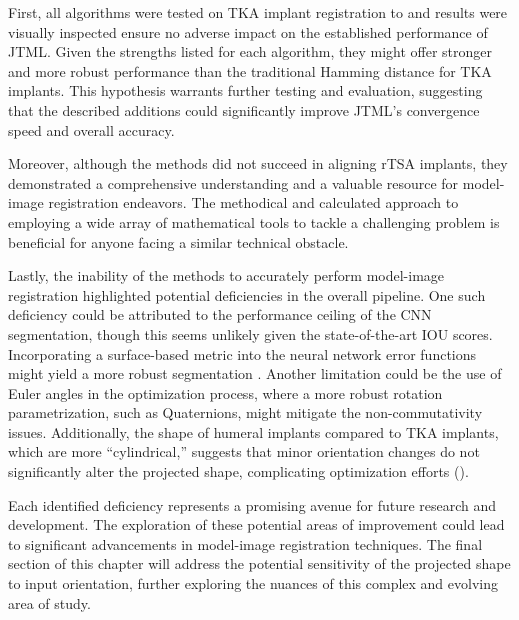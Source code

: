 First, all algorithms were tested on TKA implant registration to and results were visually inspected ensure no adverse impact on the established performance of JTML.
Given the strengths listed for each algorithm, they might offer stronger and more robust performance than the traditional Hamming distance for TKA implants.
This hypothesis warrants further testing and evaluation, suggesting that the described additions could significantly improve JTML's convergence speed and overall accuracy.

Moreover, although the methods did not succeed in aligning rTSA implants, they demonstrated a comprehensive understanding and a valuable resource for model-image registration endeavors.
The methodical and calculated approach to employing a wide array of mathematical tools to tackle a challenging problem is beneficial for anyone facing a similar technical obstacle.

Lastly, the inability of the methods to accurately perform model-image registration highlighted potential deficiencies in the overall pipeline.
One such deficiency could be attributed to the performance ceiling of the CNN segmentation, though this seems unlikely given the state-of-the-art IOU scores.
Incorporating a surface-based metric into the neural network error functions might yield a more robust segmentation \cite{reinkeCommonLimitationsImage2023,reinkeUnderstandingMetricrelatedPitfalls2023}.
Another limitation could be the use of Euler angles in the optimization process, where a more robust rotation parametrization, such as Quaternions, might mitigate the non-commutativity issues.
Additionally, the shape of humeral implants compared to TKA implants, which are more ``cylindrical,'' suggests that minor orientation changes do not significantly alter the projected shape, complicating optimization efforts ().

Each identified deficiency represents a promising avenue for future research and development.
The exploration of these potential areas of improvement could lead to significant advancements in model-image registration techniques.
The final section of this chapter will address the potential sensitivity of the projected shape to input orientation, further exploring the nuances of this complex and evolving area of study.



